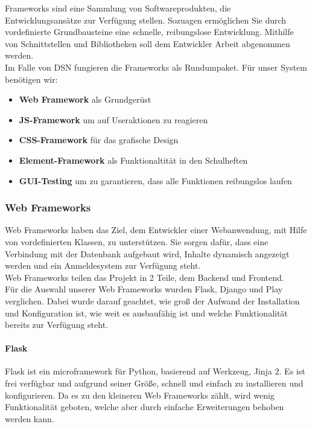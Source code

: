 
Frameworks sind eine Sammlung von Softwareprodukten, die Entwicklungsansätze zur Verfügung stellen. Sozuagen ermöglichen Sie durch vordefinierte Grundbausteine eine schnelle, reibungslose Entwicklung. Mithilfe von Schnittstellen und Bibliotheken soll dem Entwickler Arbeit abgenommen werden.\\
Im Falle von DSN fungieren die Frameworks als Rundumpaket. Für unser System benötigen wir:
\begin{itemize}
\item \textbf{Web Framework} als Grundgerüst
\item \textbf{JS-Framework} um auf Useraktionen zu reagieren
\item \textbf{CSS-Framework} für das grafische Design
\item \textbf{Element-Framework} als Funktionaltität in den Schulheften
\item \textbf{GUI-Testing} um zu garantieren, dass alle Funktionen reibungslos laufen
\end{itemize}

\subsubsection{Web Frameworks}
Web Frameworks haben das Ziel, dem Entwickler einer Webanwendung, mit Hilfe von vordefinierten Klassen, zu unterstützen. Sie sorgen dafür, dass eine Verbindung mit der Datenbank aufgebaut wird, Inhalte dynamisch angezeigt werden und ein Anmeldesystem zur Verfügung steht.\\
Web Frameworks teilen das Projekt in 2 Teile, dem Backend und Frontend.\\
Für die Auswahl unserer Web Frameworks wurden Flask, Django und Play verglichen. Dabei wurde darauf geachtet, wie groß der Aufwand der Installation und Konfiguration ist, wie weit es ausbaufähig ist und welche Funktionalität bereits zur Verfügung steht.

\newpage

\paragraph{Flask}
\grqq{}Flask ist ein microframework für Python, basierend auf Werkzeug, Jinja 2.\grqq{}\cite{FLASK} Es ist frei verfügbar und aufgrund seiner Größe, schnell und einfach zu installieren und konfigurieren. Da es zu den kleineren Web Frameworks zählt, wird wenig Funktionalität geboten, welche aber durch einfache Erweiterungen behoben werden kann.\cite{FLASK}

